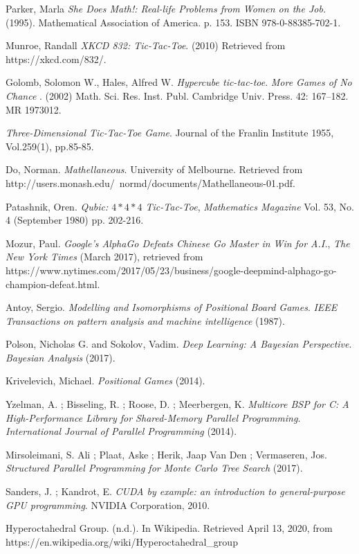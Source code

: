 \documentclass[english, 11pt]{article}
\begin{document}
\begin{thebibliography}{99}
	 Parker, Marla \textit{ She Does Math!: Real-life Problems from Women on the Job.} (1995). Mathematical Association of America. p. 153. ISBN 978-0-88385-702-1.

	Munroe, Randall \textit{XKCD 832: Tic-Tac-Toe}. (2010) Retrieved from https://xkcd.com/832/. 
	
	Golomb, Solomon W., Hales, Alfred W. \textit{Hypercube tic-tac-toe}. \textit{More Games of No Chance }. (2002) Math. Sci. Res. Inst. Publ. Cambridge Univ. Press. 42: 167–182. MR 1973012.
	
	\textit{Three-Dimensional Tic-Tac-Toe Game}. Journal of the Franlin Institute 1955, Vol.259(1), pp.85-85.
	
	Do, Norman. \textit{Mathellaneous}. University of Melbourne. Retrieved from http://users.monash.edu/~normd/documents/Mathellaneous-01.pdf.
	
	
	Patashnik, Oren. \textit{Qubic: $4*4*4$ Tic-Tac-Toe}, \textit{Mathematics Magazine} Vol. 53, No. 4 (September 1980) pp. 202-216. 
	
	Mozur, Paul. \textit{Google’s AlphaGo Defeats Chinese Go Master in Win for A.I.}, \textit{The New York Times} (March 2017), retrieved from https://www.nytimes.com/2017/05/23/business/google-deepmind-alphago-go-champion-defeat.html. 
		
	Antoy, Sergio. \textit{Modelling and Isomorphisms of Positional Board Games}.\textit{ IEEE Transactions on pattern analysis and machine intelligence} (1987).
	
	Polson, Nicholas G. and Sokolov, Vadim. \textit{Deep Learning: A Bayesian Perspective}. \textit{Bayesian Analysis} (2017).
	
	Krivelevich, Michael. \textit{Positional Games} (2014).
	
	Yzelman, A. ; Bisseling, R. ; Roose, D. ; Meerbergen, K. \textit{Multicore BSP for C: A High-Performance Library for Shared-Memory Parallel Programming}. \textit{International Journal of Parallel Programming} (2014).
	
	Mirsoleimani, S. Ali ; Plaat, Aske ; Herik, Jaap Van Den ; Vermaseren, Jos. \textit{Structured Parallel Programming for Monte Carlo Tree Search} (2017).
	
	Sanders, J. ; Kandrot, E. \textit{CUDA by example: an introduction to general-purpose GPU programming}. NVIDIA Corporation, 2010.
	
	 Hyperoctahedral Group. (n.d.). In Wikipedia. Retrieved April 13, 2020, from https://en.wikipedia.org/wiki/Hyperoctahedral\_group
\end{thebibliography}
\end{document}
